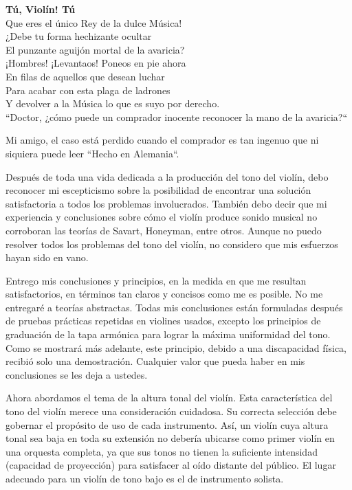 \documentclass[12pt]{book}
\begin{document}
\textbf{Tú, Violín! Tú}\\
Que eres el único Rey de la dulce Música!\\
¿Debe tu forma hechizante ocultar\\
El punzante aguijón mortal de la avaricia?\\
¡Hombres! ¡Levantaos! Poneos en pie ahora\\
En filas de aquellos que desean luchar\\
Para acabar con esta plaga de ladrones\\
Y devolver a la Música lo que es suyo por derecho.\\

``Doctor, ¿cómo puede un comprador inocente reconocer la mano de la avaricia?``\newline

Mi amigo, el caso está perdido cuando el comprador es tan ingenuo que ni siquiera puede leer ``Hecho en Alemania``.\newline

Después de toda una vida dedicada a la producción del tono del violín, debo reconocer mi escepticismo sobre la posibilidad de encontrar una solución satisfactoria a todos los problemas involucrados. También debo decir que mi experiencia y conclusiones sobre cómo el violín produce sonido musical no corroboran las teorías de Savart, Honeyman, entre otros. Aunque no puedo resolver todos los problemas del tono del violín, no considero que mis esfuerzos hayan sido en vano.\newline

Entrego mis conclusiones y principios, en la medida en que me resultan satisfactorios, en términos tan claros y concisos como me es posible. No me entregaré a teorías abstractas. Todas mis conclusiones están formuladas después de pruebas prácticas repetidas en violines usados, excepto los principios de graduación de la tapa armónica para lograr la máxima uniformidad del tono. Como se mostrará más adelante, este principio, debido a una discapacidad física, recibió solo una demostración. Cualquier valor que pueda haber en mis conclusiones se les deja a ustedes.\newline

Ahora abordamos el tema de la altura tonal del violín. Esta característica del tono del violín merece una consideración cuidadosa. Su correcta selección debe gobernar el propósito de uso de cada instrumento. Así, un violín cuya altura tonal sea baja en toda su extensión no debería ubicarse como primer violín en una orquesta completa, ya que sus tonos no tienen la suficiente intensidad (capacidad de proyección) para satisfacer al oído distante del público. El lugar adecuado para un violín de tono bajo es el de instrumento solista.
\end{document}
